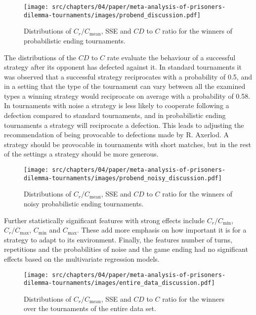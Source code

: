 \begin{figure}[!htbp]
    \centering
        \centering
        \texttt{[image: src/chapters/04/paper/meta-analysis-of-prisoners-dilemma-tournaments/images/probend\_discussion.pdf]}
        \caption{Distributions of \(C_r / C_{\text{mean}}\), SSE and \(CD\) to \(C\) ratio
        for the winners of probabilistic ending tournaments.}
        \label{fig:discussion_probend}
\end{figure}

The distributions of the \(CD\) to \(C\) rate evaluate the behaviour of a
successful strategy after its opponent has defected against it. In standard
tournaments it was observed that a successful strategy reciprocates with a
probability of 0.5, and in a setting that the type
of the tournament can vary between all the examined types a winning strategy
would reciprocate on average with a probability of 0.58. In
tournaments with noise a strategy is less likely to cooperate following a
defection compared to standard tournaments, and in probabilistic ending
tournaments a strategy will reciprocate a defection.
This leads to adjusting the recommendation of being provocable to defections made
by R. Axerlod. A strategy should be provocable in tournaments with short matches,
but in the rest of the settings a strategy should be more generous.

\begin{figure}[!htbp]
    \centering
        \centering
        \texttt{[image: src/chapters/04/paper/meta-analysis-of-prisoners-dilemma-tournaments/images/probend\_noisy\_discussion.pdf]}
        \caption{Distributions of \(C_r / C_{\text{mean}}\), SSE and \(CD\) to \(C\) ratio
        for the winners of noisy probabilistic ending tournaments.}
        \label{fig:discussion_probend_noisy}
\end{figure}

Further statistically significant features with strong effects include \(C_r /
C_{\text{min}}\), \(C_r / C_{\text{max}}\), \(C_{\text{min}}\) and
\(C_{\text{max}}\). These add more emphasis on how important it is for a
strategy to adapt to its environment. Finally, the features number of turns,
repetitions and the probabilities of noise and the game ending had no
significant effects based on the multivariate regression models.

\begin{figure}[!htbp]
    \centering
        \centering
        \texttt{[image: src/chapters/04/paper/meta-analysis-of-prisoners-dilemma-tournaments/images/entire\_data\_discussion.pdf]}
        \caption{Distributions of \(C_r / C_{\text{mean}}\), SSE and \(CD\) to \(C\) ratio
        for the winners over the tournaments of the entire data set.}
        \label{fig:discussion_entire_data}
\end{figure}

